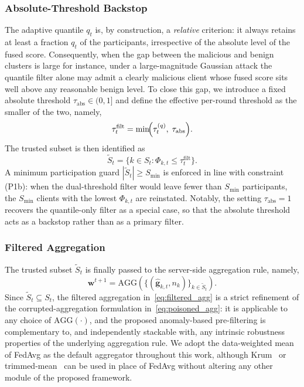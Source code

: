 \documentclass[journal]{IEEEtran}
\begin{document}
\subsubsection{Absolute-Threshold Backstop}
The adaptive quantile $q_t$ is, by construction, a \emph{relative} criterion: it always retains at least a fraction $q_t$ of the participants, irrespective of the absolute level of the fused score. Consequently, when the gap between the malicious and benign clusters is large for instance, under a large-magnitude Gaussian attack the quantile filter alone may admit a clearly malicious client whose fused score sits well above any reasonable benign level. To close this gap, we introduce a fixed absolute threshold $\tau_{\mathrm{abs}} \in (0,1]$ and define the effective per-round threshold as the smaller of the two, namely,
\begin{equation}
\tau_t^{\mathrm{filt}} = \min\!\Bigl(\tau_t^{(q)},\; \tau_{\mathrm{abs}}\Bigr).
\label{eq:dual_thresh}
\end{equation}
The trusted subset is then identified as
\begin{equation}
\widetilde{S}_t = \bigl\{k \in S_t : \Phi_{k,t} \le \tau_t^{\mathrm{filt}}\bigr\}.
\label{eq:filtered_set}
\end{equation}
A minimum participation guard $|\widetilde{S}_t| \ge S_{\min}$ is enforced in line with constraint (P1b): when the dual-threshold filter would leave fewer than $S_{\min}$ participants, the $S_{\min}$ clients with the lowest $\Phi_{k,t}$ are reinstated. Notably, the setting $\tau_{\mathrm{abs}}=1$ recovers the quantile-only filter as a special case, so that the absolute threshold acts as a backstop rather than as a primary filter.

\subsubsection{Filtered Aggregation}
The trusted subset $\widetilde{S}_t$ is finally passed to the server-side aggregation rule, namely,
\begin{equation}
\mathbf{w}^{t+1} = \text{AGG}\!\left(\{(\hat{\mathbf{g}}_{k,t}, n_k)\}_{k \in \widetilde{S}_t}\right).
\label{eq:filtered_agg}
\end{equation}
Since $\widetilde{S}_t \subseteq S_t$, the filtered aggregation in~\eqref{eq:filtered_agg} is a strict refinement of the corrupted-aggregation formulation in~\eqref{eq:poisoned_agg}: it is applicable to any choice of $\text{AGG}(\cdot)$, and the proposed anomaly-based pre-filtering is complementary to, and independently stackable with, any intrinsic robustness properties of the underlying aggregation rule. We adopt the data-weighted mean of FedAvg as the default aggregator throughout this work, although Krum~\cite{blanchard2017machine} or trimmed-mean~\cite{yin2018byzantine} can be used in place of FedAvg without altering any other module of the proposed framework.
\end{document}
